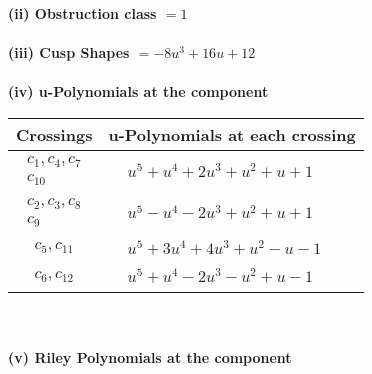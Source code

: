 \documentclass[1p]{elsarticle_modified}
\theoremstyle{definition}
\begin{document}
\flushleft \textbf{(ii) Obstruction class $= 1$}\\~\\
\flushleft \textbf{(iii) Cusp Shapes $= -8 u^3+16 u+12$}\\~\\
\newpage\renewcommand{\arraystretch}{1}
\flushleft \textbf{(iv) u-Polynomials at the component}\newline \\
\begin{tabular}{m{50pt}|m{274pt}}
Crossings & \hspace{64pt}u-Polynomials at each crossing \\
\hline $$\begin{aligned}c_{1},c_{4},c_{7}\\c_{10}\end{aligned}$$&$\begin{aligned}
&u^5+u^4+2 u^3+u^2+u+1
\end{aligned}$\\
\hline $$\begin{aligned}c_{2},c_{3},c_{8}\\c_{9}\end{aligned}$$&$\begin{aligned}
&u^5- u^4-2 u^3+u^2+u+1
\end{aligned}$\\
\hline $$\begin{aligned}c_{5},c_{11}\end{aligned}$$&$\begin{aligned}
&u^5+3 u^4+4 u^3+u^2- u-1
\end{aligned}$\\
\hline $$\begin{aligned}c_{6},c_{12}\end{aligned}$$&$\begin{aligned}
&u^5+u^4-2 u^3- u^2+u-1
\end{aligned}$\\
\hline
\end{tabular}\\~\\
\newpage\renewcommand{\arraystretch}{1}
\flushleft \textbf{(v) Riley Polynomials at the component}\newline \\
\end{document}
